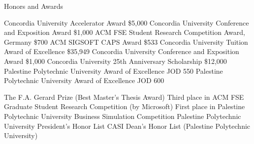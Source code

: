 
\begin{rubric}{Honors and Awards}

    \entry*[2020] Concordia University Accelerator Award \hfill \$5,000
    \entry*[2018] Concordia University Conference and Exposition Award \hfill \$1,000
    \entry*[2017] ACM FSE Student Research Competition Award, Germany \hfill \$700
    \entry*[2017] ACM SIGSOFT CAPS Award \hfill \$533
    \entry*[2017] Concordia University Tuition Award of Excellence \hfill \$35,949
    \entry*[2017] Concordia University Conference and Exposition Award \hfill \$1,000
    \entry*[2017] Concordia University 25th Anniversary Scholarship \hfill \$12,000
    \entry*[2015] Palestine Polytechnic University Award of Excellence \hfill JOD 550
    \entry*[2014] Palestine Polytechnic University Award of Excellence \hfill JOD 600

    \entry*[2019] The F.A. Gerard Prize (Best Master’s Thesis Award)
    \entry*[2017] Third place in ACM FSE Graduate Student Research Competition (by Microsoft)
    \entry*[2016] First place in Palestine Polytechnic University Business Simulation Competition
    \entry*[2015] Palestine Polytechnic University President’s Honor List
    \entry*[2014] CASI Dean’s Honor List (Palestine Polytechnic University)
\end{rubric}


